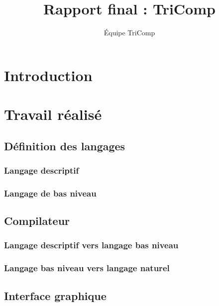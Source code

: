 \documentclass{article}
\title{Rapport final : TriComp}
\author{Équipe TriComp}
\date{}
\begin{document}
\maketitle

\newpage

\tableofcontents

\newpage

\section*{Introduction}


\section{Travail réalisé}

\subsection{Définition des langages}

\subsubsection{Langage descriptif}


\subsubsection{Langage de bas niveau}




\subsection{Compilateur}

\subsubsection{Langage descriptif vers langage bas niveau}

\subsubsection{Langage bas niveau vers langage naturel}




\subsection{Interface graphique}
\end{document}
